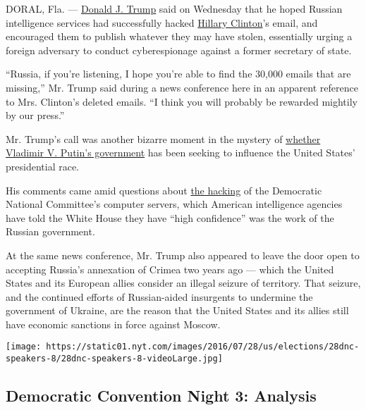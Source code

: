 DORAL, Fla. ---
\href{http://www.nytimes.com/interactive/2016/us/elections/donald-trump-on-the-issues.html?inline=nyt-per}{Donald
J. Trump} said on Wednesday that he hoped Russian intelligence services
had successfully hacked
\href{http://www.nytimes.com/interactive/2016/us/elections/hillary-clinton-on-the-issues.html?inline=nyt-per}{Hillary
Clinton}'s email, and encouraged them to publish whatever they may have
stolen, essentially urging a foreign adversary to conduct cyberespionage
against a former secretary of state.

``Russia, if you're listening, I hope you're able to find the 30,000
emails that are missing,'' Mr. Trump said during a news conference here
in an apparent reference to Mrs. Clinton's deleted emails. ``I think you
will probably be rewarded mightily by our press.''

Mr. Trump's call was another bizarre moment in the mystery of
\href{https://www.nytimes.com/2016/07/27/us/politics/spy-agency-consensus-grows-that-russia-hacked-dnc.html}{whether
Vladimir V. Putin's government} has been seeking to influence the United
States' presidential race.

His comments came amid questions about
\href{http://www.nytimes.com/2016/07/25/us/politics/donald-trump-russia-emails.html?_r=1}{the
hacking} of the Democratic National Committee's computer servers, which
American intelligence agencies have told the White House they have
``high confidence'' was the work of the Russian government.

At the same news conference, Mr. Trump also appeared to leave the door
open to accepting Russia's annexation of Crimea two years ago --- which
the United States and its European allies consider an illegal seizure of
territory. That seizure, and the continued efforts of Russian-aided
insurgents to undermine the government of Ukraine, are the reason that
the United States and its allies still have economic sanctions in force
against Moscow.

\href{https://www.nytimes.com/interactive/2016/07/27/us/elections/dnc-speakers.html}{}

\texttt{[image: https://static01.nyt.com/images/2016/07/28/us/elections/28dnc-speakers-8/28dnc-speakers-8-videoLarge.jpg]}

\hypertarget{democratic-convention-night-3-analysis}{%
\subsection{Democratic Convention Night 3:
Analysis}\label{democratic-convention-night-3-analysis}}


